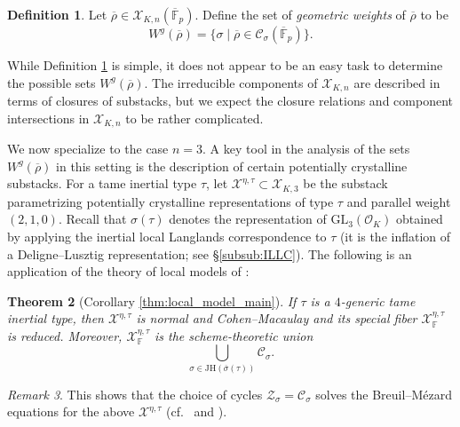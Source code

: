 \documentclass[oneside,a4paper,english, 11pt]{amsart}
\theoremstyle{plain}
\newtheorem{thm}{Theorem}[subsection]
\theoremstyle{plain}
\theoremstyle{plain}
\theoremstyle{plain}
\theoremstyle{plain}
\theoremstyle{plain}
\theoremstyle{definition}
\newtheorem{defn}[thm]{Definition}
\theoremstyle{definition}
\theoremstyle{definition}
\theoremstyle{remark}
\newtheorem{rmk}[thm]{Remark}
\numberwithin{equation}{section}
\newcommand{\F}{\mathbb{F}}
\newcommand{\cC}{\mathcal{C}}
\newcommand{\cO}{\mathcal{O}}
\newcommand{\cX}{\mathcal{X}}
\newcommand{\cZ}{\mathcal{Z}}
\newcommand{\GL}{\mathrm{GL}}
\newcommand{\JH}{\mathrm{JH}}
\newcommand{\rhobar}{\overline{\rho}}
\newcommand{\ovl}[1]{\overline{#1}}
\begin{document}
\begin{defn} \label{def:intro:geoweight}  Let $\rhobar \in \cX_{K, n} (\overline{\F}_p)$.   Define the set of \emph{geometric weights} of $\rhobar$ to be 
\[
W^g(\rhobar) = \{ \sigma \mid \rhobar \in \cC_{\sigma}(\overline{\F}_p) \}.  
\]
\end{defn}

\noindent While Definition \ref{def:intro:geoweight} is simple, it does not appear to be an easy task to determine the possible sets $W^g(\rhobar)$. 
The irreducible components of $\cX_{K, n}$ are described in terms of closures of substacks, but we expect the closure relations and component intersections in $\cX_{K, n}$ to be rather complicated.%
%

%
We now specialize to the case $n=3$. 
A key tool in the analysis of the sets $W^g(\rhobar)$ in this setting is the description of certain potentially crystalline substacks. 
For a tame inertial type $\tau$, let $\cX^{\eta,\tau} \subset \cX_{K, 3}$ be the substack parametrizing potentially crystalline representations of type $\tau$ and parallel weight $(2,1, 0)$.   
Recall that $\sigma(\tau)$ denotes the representation of $\GL_3(\cO_K)$ obtained by applying the inertial local Langlands correspondence to $\tau$ (it is the inflation of a Deligne--Lusztig representation; see \S \ref{subsub:ILLC}).
%
The following is an application of the theory of local models of \cite{MLM}:
%

\begin{thm}[Corollary \ref{thm:local_model_main}]
\label{thm:1:prelim}
If $\tau$ is a $4$-generic tame inertial type, then $\cX^{\eta,\tau}$ is normal and Cohen--Macaulay and its special fiber $\cX^{\eta,\tau}_{\F}$ is reduced. Moreover, $\cX^{\eta,\tau}_{\F}$ is the scheme-theoretic union
\[
\bigcup_{\sigma \in \JH(\ovl{\sigma}(\tau))}\cC_\sigma.
\]
\end{thm}
\begin{rmk}\label{rmk:BM:prelim}
This shows that the choice of cycles $\cZ_\sigma=\cC_\sigma$ solves the Breuil--M\'ezard equations for the above $\cX^{\eta,\tau}$  (cf.~\cite[Conjecture 8.2.2]{EGstack} and \cite[Conjecture 8.1.1]{MLM}).
%
\end{rmk}
\end{document}
